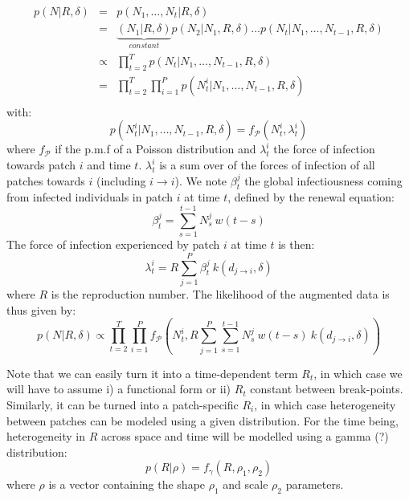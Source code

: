 \documentclass[a4paper,11pt]{article}
\begin{document}
\begin{eqnarray}
p(N | R, \delta) & = & p(N_1, \ldots, N_t | R, \delta)\\
 & = & \underbrace{(N_1| R, \delta)}_{constant} p(N_2| N_1, R, \delta) \ldots 
       p(N_t| N_1, \ldots, N_{t-1}, R, \delta) \\
 & \propto & \prod_{t=2}^T p(N_t| N_1, \ldots, N_{t-1}, R, \delta)\\
 & = & \prod_{t=2}^T \prod_{i=1}^P 
       p(N_t^i| N_1, \ldots, N_{t-1}, R, \delta)\\
\end{eqnarray}
with:
\begin{equation}
p(N_t^i| N_1, \ldots, N_{t-1}, R, \delta) = f_\mathcal{P}(N_t^i, \lambda_t^i)
\end{equation}
where $f_\mathcal{P}$ if the p.m.f of a Poisson distribution and $\lambda_t^i$ 
the force of infection towards patch $i$ and time $t$.
$\lambda_t^i$ is a sum over of the forces of infection of all patches towards $i$ (including $i \rightarrow i$). 
We note $\beta_t^j$ the global infectiousness coming from infected individuals 
in patch $i$ at time $t$, defined by the renewal equation:
\begin{equation}
 \beta_t^j = \sum_{s=1}^{t-1} N_s^j \:  w(t - s)
\end{equation}
The force of infection experienced by patch $i$ at time $t$ is then:
\begin{equation}
\lambda_t^i = R \sum_{j=1}^P \beta_t^j \: k(d_{j\rightarrow i},\delta)
\end{equation}
where $R$ is the reproduction number. 
The likelihood of the augmented data is thus given by:
\begin{equation}
p(N|R, \delta) \propto \prod_{t=2}^T \prod_{i=1}^P 
       f_\mathcal{P}(N_t^i, R 
       \sum_{j=1}^P \sum_{s=1}^{t-1} N_s^j \:  w(t - s) \:
       k(d_{j\rightarrow i},\delta) )
\end{equation}


Note that we can easily turn it into a time-dependent term $R_t$, in which 
case 
we will have to assume i) a functional form or ii) $R_t$ constant 
between break-points. 
Similarly, it can be turned into a patch-specific $R_i$, in which case 
heterogeneity between patches can be modeled using a given distribution.
For the time being, heterogeneity in $R$ across space and time will be modelled 
using a gamma (?) distribution:
\begin{equation}
p(R | \rho) = f_{\gamma} (R, \rho_1, \rho_2)
\end{equation}
where $\rho$ is a vector containing the shape $\rho_1$ and scale 
$\rho_2$ parameters.
\\
\end{document}
